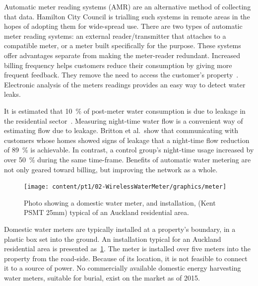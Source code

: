   Automatic meter reading systems (AMR) are an alternative method of collecting that data.
  Hamilton City Council is trialling such systems in remote areas in the hopes of adopting them for wide-spread use.
  There are two types of automatic meter reading systems:
  an external reader/transmitter that attaches to a compatible meter, or a meter built specifically for the purpose.
  These systems offer advantages separate from making the meter-reader redundant.
  Increased billing frequency helps customers reduce their consumption by giving more frequent feedback.
  They remove the need to access the customer's property~\cite{Chang2012}.
  Electronic analysis of the meters readings provides an easy way to detect water leaks.

  It is estimated that \SI{10}{\percent} of post-meter water consumption is due to leakage in the residential sector~\cite{Britton2013}.
  Measuring night-time water flow is a convenient way of estimating flow due to leakage.
  Britton et al.\ show that communicating with customers whose homes showed signs of leakage that a night-time flow reduction of \SI{89}{\percent} is achievable.
  In contrast, a control group's night-time usage increased by over \SI{50}{\percent} during the same time-frame.
  Benefits of automatic water metering are not only geared toward billing, but improving the network as a whole.

  \begin{figure}
    \centering
    \texttt{[image: content/pt1/02-WirelessWaterMeter/graphics/meter]}
    \caption{\label{fig:Photo_DomesticWaterMeter}Photo showing a domestic water meter, and installation, (Kent PSMT 25mm) typical of an Auckland residential area.}
  \end{figure}
  Domestic water meters are typically installed at a property's boundary, in a plastic box set into the ground.
  An installation typical for an Auckland residential area is presented as~\cref{fig:Photo_DomesticWaterMeter}.
  The meter is installed over five meters into the property from the road-side.
  Because of its location, it is not feasible to connect it to a source of power.
  No commercially available domestic energy harvesting water meters, suitable for burial, exist on the market as of 2015.

